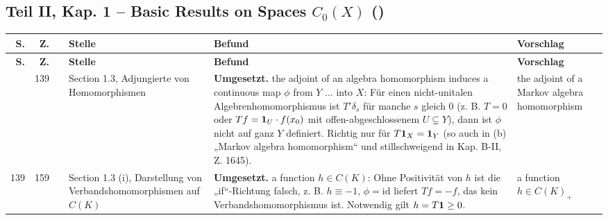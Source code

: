 \documentclass[10pt]{article}
\begin{document}
\subsection*{Teil II, Kap. 1 – Basic Results on Spaces $C\ensuremath{_{0}}(X)$ ()}
\begin{longtable}{@{}rrc>{\RaggedRight\arraybackslash}p{3.0cm}>{\RaggedRight\arraybackslash}p{11.4cm}>{\RaggedRight\arraybackslash}p{7.4cm}@{}}
\toprule
\textbf{S.} & \textbf{Z.} & \textbf{} & \textbf{Stelle} & \textbf{Befund} & \textbf{Vorschlag} \\
\midrule
\endfirsthead
\toprule
\textbf{S.} & \textbf{Z.} & \textbf{} & \textbf{Stelle} & \textbf{Befund} & \textbf{Vorschlag} \\
\midrule
\endhead
\bottomrule
\endlastfoot
139 & 139 & \sichC{} & Section 1.3, Adjungierte von Homomorphismen & \textbf{Umgesetzt.} {the adjoint of an algebra homomorphism induces a continuous map $\phi$ from $Y$ ... into $X$}: Für einen nicht-unitalen Algebrenhomomorphismus ist $T'\delta_{s}$ für manche $s$ gleich $0$ (z. B. $T=0$ oder $Tf = \mathbf{1}_{U}\cdot f(x_{0})$ mit offen-abgeschlossenem $U \subsetneq Y$), dann ist $\phi$ nicht auf ganz $Y$ definiert. Richtig nur für $T\mathbf{1}_{X} = \mathbf{1}_{Y}$ (so auch in (b) „Markov algebra homomorphism“ und stillschweigend in Kap. B-II, Z. 1645). & {the adjoint of a Markov algebra homomorphism} \\[2pt]
139 & 159 & \sichA{} & Section 1.3 (i), Darstellung von Verbandshomomorphismen auf $C(K)$ & \textbf{Umgesetzt.} {a function $h \in C(K)$}: Ohne Positivität von $h$ ist die „if“-Richtung falsch, z. B. $h \equiv -1$, $\phi = \mathrm{id}$ liefert $Tf = -f$, das kein Verbandshomomorphismus ist. Notwendig gilt $h = T\1 \geq 0$. & {a function $h \in C(K)_{+}$} \\
\end{longtable}
\end{document}
